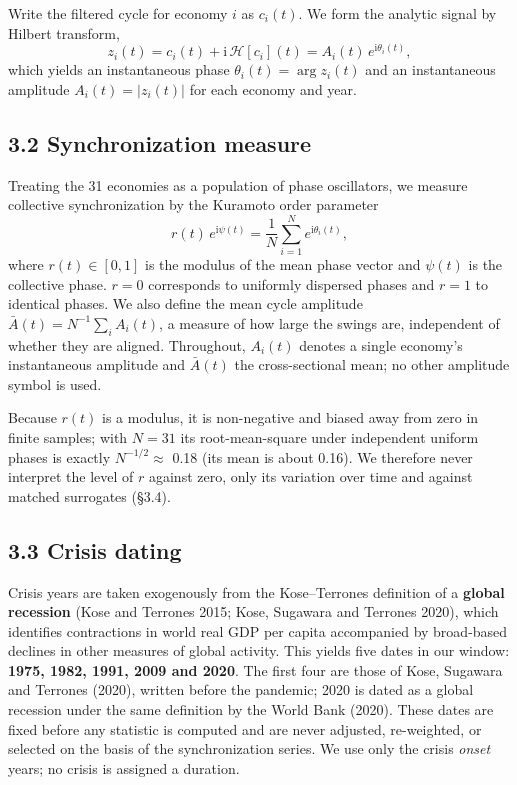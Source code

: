 \documentclass[11pt,a4paper]{article}
\begin{document}
Write the filtered cycle for economy \(i\) as \(c_i(t)\). We form the analytic signal by Hilbert transform, \[z_i(t) = c_i(t) + \mathrm{i}\,\mathcal{H}[c_i](t) = A_i(t)\,e^{\mathrm{i}\theta_i(t)},\] which yields an instantaneous phase \(\theta_i(t) = \arg z_i(t)\) and an instantaneous amplitude \(A_i(t) = |z_i(t)|\) for each economy and year.

\subsection{3.2 Synchronization measure}\label{synchronization-measure}

Treating the 31 economies as a population of phase oscillators, we measure collective synchronization by the Kuramoto order parameter \[r(t)\,e^{\mathrm{i}\psi(t)} = \frac{1}{N}\sum_{i=1}^{N} e^{\mathrm{i}\theta_i(t)},\] where \(r(t) \in [0,1]\) is the modulus of the mean phase vector and \(\psi(t)\) is the collective phase. \(r = 0\) corresponds to uniformly dispersed phases and \(r = 1\) to identical phases. We also define the mean cycle amplitude \(\bar{A}(t) = N^{-1}\sum_i A_i(t)\), a measure of how large the swings are, independent of whether they are aligned. Throughout, \(A_i(t)\) denotes a single economy's instantaneous amplitude and \(\bar{A}(t)\) the cross-sectional mean; no other amplitude symbol is used.

Because \(r(t)\) is a modulus, it is non-negative and biased away from zero in finite samples; with \(N = 31\) its root-mean-square under independent uniform phases is exactly \(N^{-1/2} \approx\) 0.18 (its mean is about 0.16). We therefore never interpret the level of \(r\) against zero, only its variation over time and against matched surrogates (§3.4).

\subsection{3.3 Crisis dating}\label{crisis-dating}

Crisis years are taken exogenously from the Kose–Terrones definition of a \textbf{global recession} (Kose and Terrones 2015; Kose, Sugawara and Terrones 2020), which identifies contractions in world real GDP per capita accompanied by broad-based declines in other measures of global activity. This yields five dates in our window: \textbf{1975, 1982, 1991, 2009 and 2020}. The first four are those of Kose, Sugawara and Terrones (2020), written before the pandemic; 2020 is dated as a global recession under the same definition by the World Bank (2020). These dates are fixed before any statistic is computed and are never adjusted, re-weighted, or selected on the basis of the synchronization series. We use only the crisis \emph{onset} years; no crisis is assigned a duration.
\end{document}
